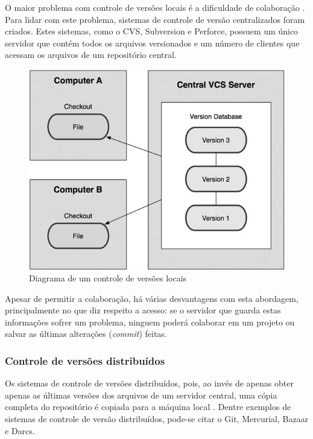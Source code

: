 O maior problema com controle de versões locais é a dificuldade de colaboração \cite[p. 3]{progit}. Para lidar com este problema, sistemas de controle de versão centralizados foram criados. Estes sistemas, como o CVS, Subversion e Perforce, possuem um único servidor que contém todos os arquivos versionados e um número de clientes que acessam os arquivos de um repositório central.

\begin{figure} [ht]
	\centering
	\includegraphics[scale=0.4]{central_version_control.png}
	\caption{Diagrama de um controle de versões locais \cite[p. 2]{progit}}
	\label{central_version_control}
\end{figure}

Apesar de permitir a colaboração, há várias desvantagens com esta abordagem, principalmente no que diz respeito a acesso: se o servidor que guarda estas informações sofrer um problema, ninguem poderá colaborar em um projeto ou salvar as últimas alterações (\emph{commit}) feitas.

\subsubsection{Controle de versões distribuídos}

Os sistemas de controle de versões distribuídos, pois, ao invés de apenas obter apenas as últimas versões dos arquivos de um servidor central, uma cópia completa do repositório é copiada para a máquina local \cite[p. 4]{progit}. Dentre exemplos de sistemas de controle de versão distribuídos, pode-se citar o Git, Mercurial, Bazaar e Darcs.

